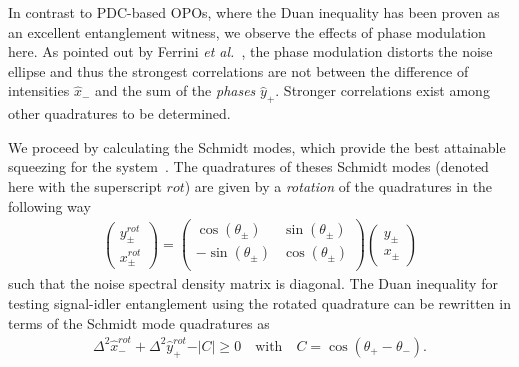 \documentclass[aps,prl,twocolumn,groupedaddress]{revtex4-1}
\begin{document}
In contrast to PDC-based OPOs, where the Duan inequality has been proven as an excellent entanglement witness, we observe the effects of phase modulation here. As pointed out by Ferrini {\em et al.}~\cite{Ferrini2014}, the phase modulation distorts the noise ellipse and thus the strongest correlations are not between the difference of intensities $\hat{x}_-$ and the sum of the \textit{phases} $\hat{y}_+$. Stronger correlations exist among other quadratures to be determined.

We proceed by calculating the Schmidt modes, which provide the best attainable squeezing for the system~\cite{Ferrini2014}. The quadratures of theses Schmidt modes (denoted here with the superscript $rot$) are given by a \textit{rotation} of the quadratures in the following way
\begin{eqnarray}
\left(\begin{array}{c}
y^{rot}_\pm\\
x^{rot}_\pm
\end{array}\right)
=\left(
\begin{array}{cc}
\cos (\theta_\pm ) & \sin (\theta_\pm ) \\
-\sin (\theta_\pm ) & \cos (\theta_\pm ) \\
\end{array}
\right)\left(\begin{array}{c}
y_\pm\\
x_\pm
\end{array}\right)\label{eqn:RotationPlusMinus}
\end{eqnarray} such that the noise spectral density matrix is diagonal. 
The Duan inequality for testing signal-idler entanglement using the rotated quadrature can be rewritten in terms of the Schmidt mode quadratures as~\cite{Giovannetti2003}
\begin{gather}
\Delta^2\hat{x}^{rot}_-  + \Delta^2\hat{y}_+^{rot} -\vert C \vert\geq 0\label{eqn:SchmidtDuanIqn}\quad
\text{with}\quad C=\cos(\theta_+-\theta_-).
\end{gather}
\end{document}
